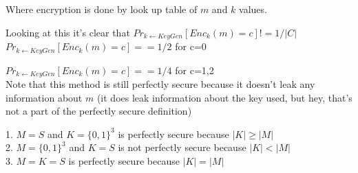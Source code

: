 \documentclass[12pt]{article}
\newenvironment{question}[2][Question]{\begin{trivlist}
		\item[\hskip \labelsep {\bfseries #1}\hskip \labelsep {\bfseries #2.}]}{\end{trivlist}}
\begin{document}
\begin{question}{1a}
			Where encryption is done by look up table of $m$ and $k$ values. 
			
			Looking at this it's clear that $Pr_{k←KeyGen}[Enc_k(m) = c] != 1/|C|$\\
			
			
			 $Pr_{k←KeyGen}[Enc_k(m) = c] == 1/2$ for c=0
			 
			 $Pr_{k←KeyGen}[Enc_k(m) = c] == 1/4$ for c=1,2\\
			 
			 
		Note that this method is still perfectly secure because it doesn't leak any information about $m$ (it does leak information about the key used, but hey, that's not a part of the perfectly secure definition)
			
			
	\end{question}
	\begin{question}{1b}
		
			\hspace{\parindent} 1. $M=S$ and $K=\{0,1\}^3$ is perfectly secure because $|K| \geq |M|$  \\
			
			\hspace{\parindent} 2. $M=\{0,1\}^3$ and $K=S$ is not perfectly secure because $|K| < |M|$  \\
			
			\hspace{\parindent} 3. $M=K=S$ is perfectly secure because $|K| = |M|$  \\
			
	\end{question}
\end{document}
